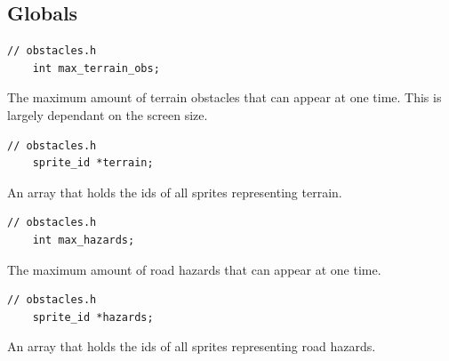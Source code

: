 \documentclass{article}
\begin{document}
\subsection*{Globals}
\begin{lstlisting}[style=CStyle]
	// obstacles.h
	int max_terrain_obs;	
\end{lstlisting}
The maximum amount of terrain obstacles that can appear at one time. This is largely dependant on the screen size.
\begin{lstlisting}[style=CStyle]
	// obstacles.h
	sprite_id *terrain;
\end{lstlisting}
An array that holds the ids of all sprites representing terrain.
\begin{lstlisting}[style=CStyle]
	// obstacles.h
	int max_hazards;
\end{lstlisting}
The maximum amount of road hazards that can appear at one time. 
\begin{lstlisting}[style=CStyle]
	// obstacles.h
	sprite_id *hazards;
\end{lstlisting}
An array that holds the ids of all sprites representing road hazards.
\newline
\end{document}
